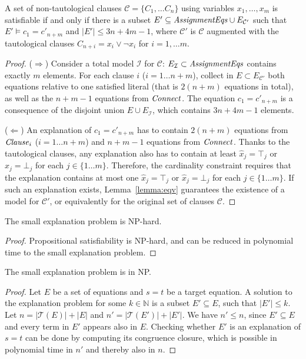 \documentclass[smallextended]{svjour3}
\newcommand{\Assignment}{{\it AssignmentEqs}}
\newcommand{\Clause}{{\it Clause}}
\newcommand{\Connect}{{\it Connect}}
\begin{document}
\begin{lemma}
A set of non-tautological clauses $\mathcal{C}= \{C_1, \dots C_n\}$ using
variables $x_1,\dots, x_m$ is satisfiable if and only if there is a subset $E'
\subseteq \Assignment \cup E_{\mathcal{C}'}$ such that $E'\models
c_1 = c'_{n+m}$ and $|E'| \leq 3n+4m-1$, where $\mathcal{C}'$ is
$\mathcal{C}$ augmented with the tautological clauses $C_{n+i} = x_i \vee \neg
x_i$ for $i=1,\dots m$.
\end{lemma}
\begin{proof}
($\Rightarrow$)  Consider a total model $\mathcal{I}$ for
$\mathcal{C}$: $E_{\mathcal{I}} \subset \Assignment$ contains exactly $m$
elements.  For each clause $i$ ($i= 1\dots n + m$), collect in $E\subset
E_{\mathcal{C}'}$ both equations relative to one satisfied literal (that is $2(n
+m)$ equations in total), as well as the $n + m - 1$ equations from $\Connect$.
The equation $c_1 = c'_{n+m}$ is a consequence of the disjoint union
$E \cup E_{\mathcal{I}}$, which contains $3n + 4m - 1$ elements.

($\Leftarrow$)  An explanation of $c_1 = c'_{n+m}$ has to contain $2(n + m)$ equations from $\Clause_i$ 
($i= 1\dots n + m$) and $n + m - 1$ equations from $\Connect$.  Thanks to the tautological
clauses, any explanation also has to contain at least $\hat{x}_j = \top_j$ or
$\hat{x}_j = \bot_j$ for each $j\in\{1\dots m\}$.  Therefore, the cardinality
constraint requires that the explanation contains at most one $\hat{x}_j =
\top_j$ or $\hat{x}_j = \bot_j$ for each $j\in\{1\dots m\}$.  If such an
explanation exists, Lemma~\ref{lemma:eqv} guarantees the existence of a model
for $\mathcal{C'}$, or equivalently for the original set of clauses
$\mathcal{C}$.
\end{proof}

\begin{corollary}[NP-hardness]
\label{lemma:nphardness}
The small explanation problem is NP-hard.
\end{corollary}
\begin{proof}
Propositional satisfiability is NP-hard, and can be reduced in polynomial time to the small explanation problem.
\end{proof}

\begin{lemma}[NP]
\label{lemma:innp}
The small explanation problem is in NP.
\end{lemma}
\begin{proof}
Let $E$ be a set of equations and $s=t$ be a target equation.
A solution to the explanation problem for some $k \in \mathbb{N}$ is a subset $E' \subseteq E$, such that $|E'| \leq k$.
Let $n = |\mathcal{T}(E)| + |E|$ and $n' = |\mathcal{T}(E')| + |E'|$.
We have $n' \leq n$, since $E' \subseteq E$ and every term in $E'$ appears also in $E$.
Checking whether $E'$ is an explanation of $s=t$ can be done by computing its congruence closure, which is possible in polynomial time in $n'$ \cite{Nelson2} and thereby also in $n$.

\end{proof}
\end{document}

